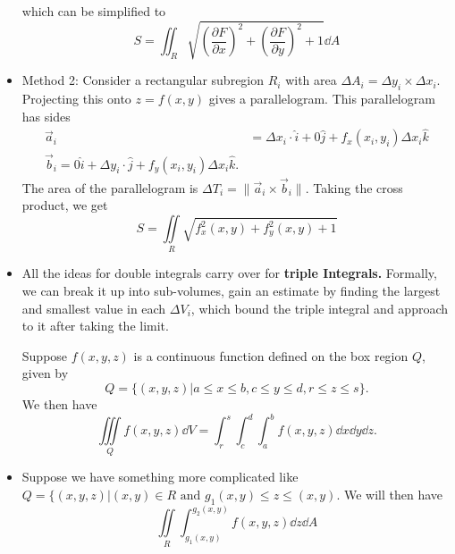 \begin{itemize}
\begin{equation}
    \end{equation}
    which can be simplified to 
    \begin{equation}
        \boxed{S = \iint_R \sqrt{\left(\frac{\partial F}{\partial x}\right)^2+\left(\frac{\partial F}{\partial y}\right)^2+1}\dd{A}}
    \end{equation}
    \item Method 2: Consider a rectangular subregion $R_i$ with area $\Delta A_i = \Delta y_i \times \Delta x_i$. Projecting this onto $z=f(x,y)$ gives a parallelogram. This parallelogram has sides 
    \begin{align}
        \vec{a}_i &= \Delta x_i \cdot \hat{i} + 0\hat{j} + f_x(x_i,y_i)\Delta x_i \hat{k} \\ 
        \vec{b}_i = 0\hat{i} + \Delta y_i \cdot \hat{j} + f_y(x_i,y_i)\Delta x_i \hat{k}.
    \end{align} 
    The area of the parallelogram is $\Delta T_i = \lVert \vec{a}_i \times \vec{b}_i \rVert.$ Taking the cross product, we get 
    \begin{equation}
        \boxed{S=\iint\limits_R\sqrt{f_x^2(x,y)+f_y^2(x,y)+1}}
    \end{equation} 
    \item All the ideas for double integrals carry over for \textbf{triple Integrals.} Formally, we can break it up into sub-volumes, gain an estimate by finding the largest and smallest value in each $\Delta V_i$, which bound the triple integral and approach to it after taking the limit.
    \begin{example}
        Suppose $f(x,y,z)$ is a continuous function defined on the box region $Q$, given by 
        \begin{equation}
            Q = \{(x,y,z)|a\le x\le b, c\le y\le d, r\le z\le s\}.
        \end{equation}
        We then have 
        \begin{equation}
            \iiint\limits_Q f(x,y,z)\dd{V} = \int_r^s\int_c^d\int_a^b f(x,y,z) \dd{x}\dd{y}\dd{z}.
        \end{equation}
    \end{example}
    \item Suppose we have something more complicated like $Q = \{(x,y,z) | (x,y) \in R\text{ and } g_1(x,y) \le z\le (x,y).$ We will then have 
    \begin{equation}
        \iint\limits_R \int_{g_1(x,y)}^{g_2(x,y)} f(x,y,z)\dd{z}\dd{A}
    \end{equation}
    \begin{example}

\end{example}
\end{itemize}
